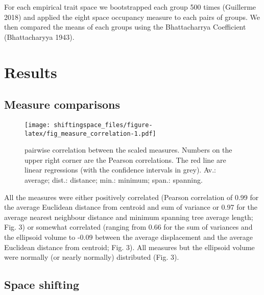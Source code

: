 \documentclass[]{article}
\begin{document}
\renewcommand\baselinestretch{1.6}\selectfont

For each empirical trait space we bootstrapped each group 500 times
(Guillerme 2018) and applied the eight space occupancy measure to each
pairs of groups. We then compared the means of each groups using the
Bhattacharrya Coefficient (Bhattacharyya 1943).

\section{Results}\label{results}

\subsection{Measure comparisons}\label{measure-comparisons-1}

\renewcommand\baselinestretch{1}\selectfont

\begin{figure}
\centering
\texttt{[image: shiftingspace\_files/figure-latex/fig\_measure\_correlation-1.pdf]}
\caption{pairwise correlation between the scaled measures. Numbers on
the upper right corner are the Pearson correlations. The red line are
linear regressions (with the confidence intervals in grey). Av.:
average; dist.: distance; min.: minimum; span.: spanning.}
\end{figure}

\renewcommand\baselinestretch{1.6}\selectfont

All the measures were either positively correlated (Pearson correlation
of 0.99 for the average Euclidean distance from centroid and sum of
variance or 0.97 for the average nearest neighbour distance and minimum
spanning tree average length; Fig. 3) or somewhat correlated (ranging
from 0.66 for the sum of variances and the ellipsoid volume to -0.09
between the average displacement and the average Euclidean distance from
centroid; Fig. 3). All measures but the ellipsoid volume were normally
(or nearly normally) distributed (Fig. 3).

\subsection{Space shifting}\label{space-shifting}

\renewcommand\baselinestretch{1}\selectfont
\end{document}

